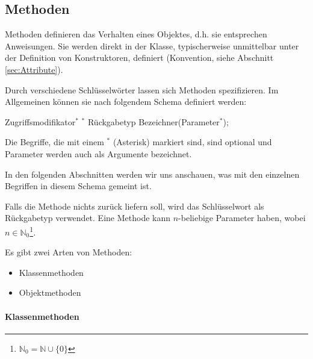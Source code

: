 \documentclass{tuda-pub}
\begin{document}
  \clearpage

  \subsection{Methoden}
  \label{sec:Methoden}

  Methoden definieren das Verhalten eines Objektes, d.h. sie entsprechen Anweisungen. Sie werden
  direkt in der Klasse, typischerweise unmittelbar unter der Definition von Konstruktoren,
  definiert (Konvention, siehe Abschnitt \ref{sec:Attribute}).

  \br

  Durch verschiedene Schlüsselwörter lassen sich Methoden spezifizieren. Im Allgemeinen können
  sie nach folgendem Schema definiert werden:

  \begin{center}
    Zugriffsmodifikator\(^*\) \(^*\) Rückgabetyp Bezeichner(Parameter\(^*\));
  \end{center}

  Die Begriffe, die mit einem \(^*\) (Asterisk) markiert sind, sind optional und Parameter werden
  auch als Argumente bezeichnet.

  \br

  In den folgenden Abschnitten werden wir uns anschauen, was mit den einzelnen Begriffen in
  diesem Schema gemeint ist.

  \br

  Falls die Methode nichts zurück liefern soll, wird das Schlüsselwort  als
  Rückgabetyp verwendet. Eine Methode kann \(n\)-beliebige Parameter haben, wobei
  \(n \in \mathbb{N}_0\)\footnote{\(\mathbb{N}_0 = \mathbb{N} \cup \{0\}\)}.

  \br

  Es gibt zwei Arten von Methoden:

  \begin{itemize}
    \item Klassenmethoden
    \item Objektmethoden
  \end{itemize}

  \paragraph{Klassenmethoden}
\end{document}
